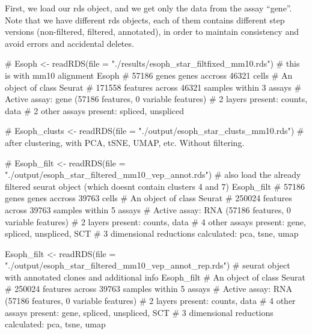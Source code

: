 \documentclass[
  letterpaper,
  DIV=11,
  numbers=noendperiod]{scrreprt}
\newenvironment{Shaded}{\begin{snugshade}}{\end{snugshade}}
\newcommand{\AttributeTok}[1]{\textcolor[rgb]{0.40,0.45,0.13}{#1}}
\newcommand{\CommentTok}[1]{\textcolor[rgb]{0.37,0.37,0.37}{#1}}
\newcommand{\FunctionTok}[1]{\textcolor[rgb]{0.28,0.35,0.67}{#1}}
\newcommand{\NormalTok}[1]{\textcolor[rgb]{0.00,0.23,0.31}{#1}}
\newcommand{\OtherTok}[1]{\textcolor[rgb]{0.00,0.23,0.31}{#1}}
\newcommand{\StringTok}[1]{\textcolor[rgb]{0.13,0.47,0.30}{#1}}
\begin{document}
First, we load our rds object, and we get only the data from the assay
``gene''. Note that we have different rds objects, each of them contains
different step versions (non-filtered, filtered, annotated), in order to
maintain consistency and avoid errors and accidental deletes.

\begin{Shaded}
\begin{Highlighting}[]
\CommentTok{\# Esoph \textless{}{-} readRDS(file = "./results/esoph\_star\_filtfixed\_mm10.rds") \# this is with mm10 alignment}
\NormalTok{Esoph }\CommentTok{\# 57186 genes genes accross 46321 cells}
\CommentTok{\# An object of class Seurat }
\CommentTok{\# 171558 features across 46321 samples within 3 assays }
\CommentTok{\# Active assay: gene (57186 features, 0 variable features)}
\CommentTok{\#  2 layers present: counts, data}
\CommentTok{\#  2 other assays present: spliced, unspliced}

\CommentTok{\# Esoph\_clusts \textless{}{-} readRDS(file = "./output/esoph\_star\_clusts\_mm10.rds") \# after clustering, with PCA, tSNE, UMAP, etc. Without filtering. }

\CommentTok{\# Esoph\_filt \textless{}{-} readRDS(file = "./output/esoph\_star\_filtered\_mm10\_vep\_annot.rds") \# also load the already filtered seurat object (which doesnt contain clusters 4 and 7)}
\NormalTok{Esoph\_filt }\CommentTok{\# 57186 genes genes accross 39763 cells}
\CommentTok{\# An object of class Seurat }
\CommentTok{\# 250024 features across 39763 samples within 5 assays }
\CommentTok{\# Active assay: RNA (57186 features, 0 variable features)}
\CommentTok{\#  2 layers present: counts, data}
\CommentTok{\#  4 other assays present: gene, spliced, unspliced, SCT}
\CommentTok{\#  3 dimensional reductions calculated: pca, tsne, umap}

\NormalTok{Esoph\_filt }\OtherTok{\textless{}{-}} \FunctionTok{readRDS}\NormalTok{(}\AttributeTok{file =} \StringTok{"./output/esoph\_star\_filtered\_mm10\_vep\_annot\_rep.rds"}\NormalTok{) }\CommentTok{\# seurat object with annotated clones and additional info}
\NormalTok{Esoph\_filt}
\CommentTok{\# An object of class Seurat }
\CommentTok{\# 250024 features across 39763 samples within 5 assays }
\CommentTok{\# Active assay: RNA (57186 features, 0 variable features)}
\CommentTok{\#  2 layers present: counts, data}
\CommentTok{\#  4 other assays present: gene, spliced, unspliced, SCT}
\CommentTok{\#  3 dimensional reductions calculated: pca, tsne, umap}
\end{Highlighting}
\end{Shaded}
\end{document}
